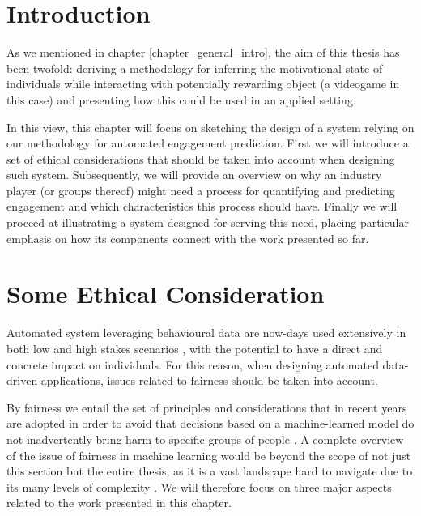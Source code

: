 \section{Introduction}
\label{industry_needs}
As we mentioned in chapter \ref{chapter_general_intro}, the aim of this thesis has been twofold: deriving a methodology for inferring the motivational state of individuals while interacting with potentially rewarding object (a videogame in this case) and presenting how this could be used in an applied setting.

In this view, this chapter will focus on sketching the design of a system relying on our methodology for automated engagement prediction. First we will introduce a set of ethical considerations that should be taken into account when designing such system. Subsequently, we will provide an overview on why an industry player (or groups thereof) might need a process for quantifying and predicting engagement and which characteristics this process should have. Finally we will proceed at illustrating a system designed for serving this need, placing particular emphasis on how its components connect with the work presented so far.

\section{Some Ethical Consideration}
\label{ehtical_considerations}
Automated system leveraging behavioural data are now-days used extensively in both low and high stakes scenarios \cite{mehrabi2021survey}, with the potential to have a direct and concrete impact on individuals. For this reason, when designing automated data-driven applications, issues related to fairness should be taken into account. 

By fairness we entail the set of principles and considerations that in recent years are adopted in order to avoid that decisions based on a machine-learned model do not inadvertently bring harm to specific groups of people \cite{mehrabi2021survey}. A complete overview of the issue of fairness in machine learning would be beyond the scope of not just this section but the entire thesis, as it is a vast landscape \cite{mehrabi2021survey} hard to navigate due to its many levels of complexity \cite{corbett2018measure}.  We will therefore focus on three major aspects related to the work presented in this chapter. 

